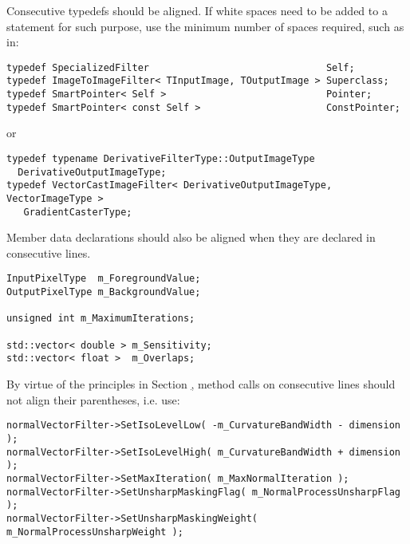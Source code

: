 Consecutive typedefs should be aligned. If white spaces need to be added to a
statement for such purpose, use the minimum number of spaces required, such as
in:

\small
\begin{verbatim}
typedef SpecializedFilter                               Self;
typedef ImageToImageFilter< TInputImage, TOutputImage > Superclass;
typedef SmartPointer< Self >                            Pointer;
typedef SmartPointer< const Self >                      ConstPointer;
\end{verbatim}
\normalsize

or

\small
\begin{verbatim}
typedef typename DerivativeFilterType::OutputImageType
  DerivativeOutputImageType;
typedef VectorCastImageFilter< DerivativeOutputImageType, VectorImageType >
   GradientCasterType;
\end{verbatim}
\normalsize

Member data declarations should also be aligned when they are declared in consecutive lines.

\small
\begin{verbatim}
InputPixelType  m_ForegroundValue;
OutputPixelType m_BackgroundValue;

unsigned int m_MaximumIterations;

std::vector< double > m_Sensitivity;
std::vector< float >  m_Overlaps;
\end{verbatim}
\normalsize

By virtue of the principles in Section \href{subsec:WhiteSpaces}, method calls
on consecutive lines should not align their parentheses, i.e. use:

\small
\begin{verbatim}
normalVectorFilter->SetIsoLevelLow( -m_CurvatureBandWidth - dimension );
normalVectorFilter->SetIsoLevelHigh( m_CurvatureBandWidth + dimension );
normalVectorFilter->SetMaxIteration( m_MaxNormalIteration );
normalVectorFilter->SetUnsharpMaskingFlag( m_NormalProcessUnsharpFlag );
normalVectorFilter->SetUnsharpMaskingWeight( m_NormalProcessUnsharpWeight );
\end{verbatim}
\normalsize


